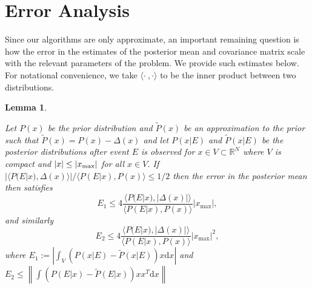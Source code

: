 \documentclass[twoside]{article}
\newtheorem{lemma}{Lemma}
\newcommand{\CRej}{\text{rejection filtering}}
\begin{document}
%


\section{Error Analysis}
\label{sec:error-analysis}

Since our algorithms are only approximate, an important remaining question is how the error in the estimates of the posterior mean
and covariance matrix scale with the relevant parameters of the problem.  We provide such estimates below.  For notational convenience,
we take $\langle \cdot\!~,\cdot \rangle$ to be the inner product between two distributions.

\begin{lemma}
    \label{lem:errprop}

    Let $P(x)$ be the prior distribution and $\tilde{P}(x)$ be an approximation to the prior such that $\tilde{P}(x) = P(x) -\Delta(x)$ and let $P(x|E)$ and $\tilde{P}(x|E)$ be the posterior distributions after event $E$ is observed for $x\in V\subset \mathbb{R}^N$ where $V$ is compact and $|x|\le |x_{\rm max}|$ for all $x\in V$.  If $|\langle P(E|x),\Delta(x) \rangle|/\langle P(E|x),P(x)\rangle \le 1/2$ then the error in the posterior mean then satisfies
    $$
    E_1 \le 4 \frac{\langle P(E|x), |\Delta(x)|\rangle}{\langle P(E|x),P(x)\rangle}|x_{\max}|,
    $$
    and similarly
    $$
    E_2 \le 4 \frac{\langle P(E|x), |\Delta(x)|\rangle}{\langle P(E|x),P(x)\rangle}|x_{\max}|^2,
    $$
where $E_1:=\left|\int_V  (P(x|E) -\tilde{P}(x|E)) x \mathrm{d} x \right|$ and $E_2 \le \left\|\int  (P(E|x) -\tilde{P}(E|x)) xx^T \mathrm{d} x \right\|$
\end{lemma}
\end{document}
